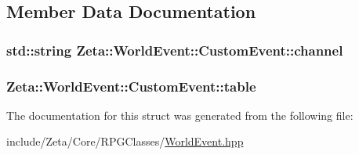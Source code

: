 \subsection{Member Data Documentation}
\hypertarget{structZeta_1_1WorldEvent_1_1CustomEvent_a2f563de54065ecc45d46ed7be7d251a1}{
\subsubsection[{channel}]{\setlength{\rightskip}{0pt plus 5cm}std\+::string Zeta\+::\+World\+Event\+::\+Custom\+Event\+::channel}}\label{structZeta_1_1WorldEvent_1_1CustomEvent_a2f563de54065ecc45d46ed7be7d251a1}
\hypertarget{structZeta_1_1WorldEvent_1_1CustomEvent_af364dcbc8aae84e80b6ea0b1f90eb1eb}{
\subsubsection[{table}]{ Zeta\+::\+World\+Event\+::\+Custom\+Event\+::table\hspace{0.3cm}{\ttfamily [mutable]}}}\label{structZeta_1_1WorldEvent_1_1CustomEvent_af364dcbc8aae84e80b6ea0b1f90eb1eb}


The documentation for this struct was generated from the following file\+:\begin{DoxyCompactItemize}
\item 
include/\+Zeta/\+Core/\+R\+P\+G\+Classes/\hyperlink{WorldEvent_8hpp}{World\+Event.\+hpp}\end{DoxyCompactItemize}
